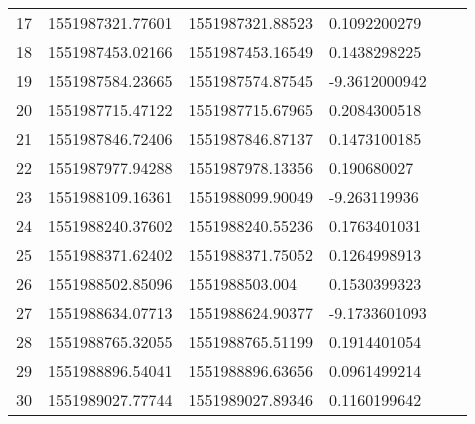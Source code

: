 \begin{landscape}
\begin{longtable}{l|l|l|l|ll}
17 & 1551987321.77601 & 1551987321.88523 & 0.1092200279 &  &  \\
18 & 1551987453.02166 & 1551987453.16549 & 0.1438298225 &  &  \\
19 & 1551987584.23665 & 1551987574.87545 & -9.3612000942 &  &  \\
20 & 1551987715.47122 & 1551987715.67965 & 0.2084300518 &  &  \\
21 & 1551987846.72406 & 1551987846.87137 & 0.1473100185 &  &  \\
22 & 1551987977.94288 & 1551987978.13356 & 0.190680027 &  &  \\
23 & 1551988109.16361 & 1551988099.90049 & -9.263119936 &  &  \\
24 & 1551988240.37602 & 1551988240.55236 & 0.1763401031 &  &  \\
25 & 1551988371.62402 & 1551988371.75052 & 0.1264998913 &  &  \\
26 & 1551988502.85096 & 1551988503.004 & 0.1530399323 &  &  \\
27 & 1551988634.07713 & 1551988624.90377 & -9.1733601093 &  &  \\
28 & 1551988765.32055 & 1551988765.51199 & 0.1914401054 &  &  \\
29 & 1551988896.54041 & 1551988896.63656 & 0.0961499214 &  &  \\
30 & 1551989027.77744 & 1551989027.89346 & 0.1160199642 &  & 
\end{longtable}
\end{landscape}

